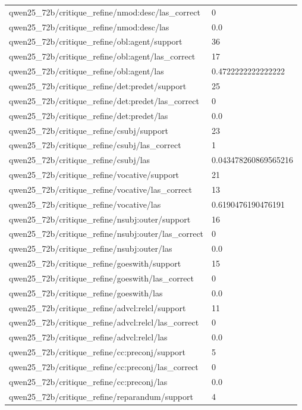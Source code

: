 \begin{tabular}{ll}
qwen25\_72b/critique\_refine/nmod:desc/las\_correct & 0 \\
qwen25\_72b/critique\_refine/nmod:desc/las & 0.0 \\
qwen25\_72b/critique\_refine/obl:agent/support & 36 \\
qwen25\_72b/critique\_refine/obl:agent/las\_correct & 17 \\
qwen25\_72b/critique\_refine/obl:agent/las & 0.4722222222222222 \\
qwen25\_72b/critique\_refine/det:predet/support & 25 \\
qwen25\_72b/critique\_refine/det:predet/las\_correct & 0 \\
qwen25\_72b/critique\_refine/det:predet/las & 0.0 \\
qwen25\_72b/critique\_refine/csubj/support & 23 \\
qwen25\_72b/critique\_refine/csubj/las\_correct & 1 \\
qwen25\_72b/critique\_refine/csubj/las & 0.043478260869565216 \\
qwen25\_72b/critique\_refine/vocative/support & 21 \\
qwen25\_72b/critique\_refine/vocative/las\_correct & 13 \\
qwen25\_72b/critique\_refine/vocative/las & 0.6190476190476191 \\
qwen25\_72b/critique\_refine/nsubj:outer/support & 16 \\
qwen25\_72b/critique\_refine/nsubj:outer/las\_correct & 0 \\
qwen25\_72b/critique\_refine/nsubj:outer/las & 0.0 \\
qwen25\_72b/critique\_refine/goeswith/support & 15 \\
qwen25\_72b/critique\_refine/goeswith/las\_correct & 0 \\
qwen25\_72b/critique\_refine/goeswith/las & 0.0 \\
qwen25\_72b/critique\_refine/advcl:relcl/support & 11 \\
qwen25\_72b/critique\_refine/advcl:relcl/las\_correct & 0 \\
qwen25\_72b/critique\_refine/advcl:relcl/las & 0.0 \\
qwen25\_72b/critique\_refine/cc:preconj/support & 5 \\
qwen25\_72b/critique\_refine/cc:preconj/las\_correct & 0 \\
qwen25\_72b/critique\_refine/cc:preconj/las & 0.0 \\
qwen25\_72b/critique\_refine/reparandum/support & 4 \\

\end{tabular}
